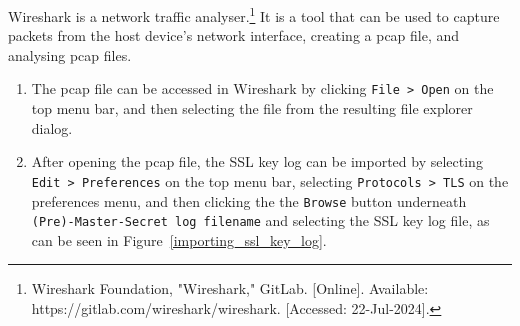 \begin{myenum}
	\item Wireshark is a network traffic analyser.\footnote{Wireshark Foundation, "Wireshark," GitLab. [Online]. Available: https://gitlab.com/wireshark/wireshark. [Accessed: 22-Jul-2024].} It is a tool that can be used to capture packets from the host device's network interface, creating a pcap file, and analysing pcap files.
		\begin{enumerate}
			\item The pcap file can be accessed in Wireshark by clicking \texttt{File > Open}  on the top menu bar, and then selecting the file from the resulting file explorer dialog.
			\item After opening the pcap file, the SSL key log can be imported by selecting \texttt{Edit > Preferences} on the top menu bar, selecting \texttt{Protocols > TLS} on the preferences menu, and then clicking the the \texttt{Browse} button underneath \texttt{(Pre)-Master-Secret log filename} and selecting the SSL key log file, as can be seen in Figure~\ref{importing_ssl_key_log}.
		\end{enumerate}
	

\end{myenum}
